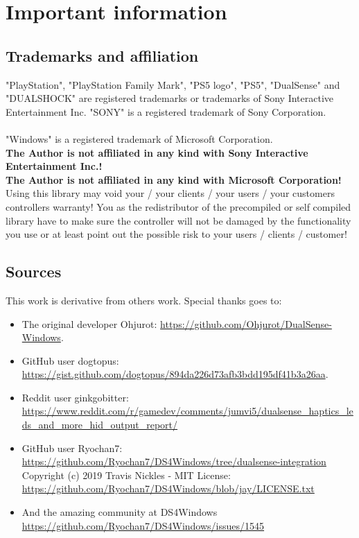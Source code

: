 \section{Important information}
\subsection{Trademarks and affiliation}
"PlayStation", "PlayStation Family Mark", "PS5 logo", "PS5", "DualSense" and "DUALSHOCK" are registered trademarks or trademarks of Sony Interactive Entertainment Inc. "SONY" is a registered trademark of Sony Corporation. \\
\\
"Windows" is a registered trademark of Microsoft Corporation. \\

\textbf{The Author is not affiliated in any kind with Sony Interactive Entertainment Inc.!} \\
\textbf{The Author is not affiliated in any kind with Microsoft Corporation!} \\
Using this library may void your / your clients / your users / your customers controllers warranty! You as the redistributor of the precompiled or self compiled library have to make sure the controller will not be damaged by the functionality you use or at least point out the possible risk to your users / clients / customer!\\

\subsection{Sources}
This work is derivative from others work. Special thanks goes to:
\begin{itemize}
    \item The original developer Ohjurot:
    \url{https://github.com/Ohjurot/DualSense-Windows}.
	\item GitHub user dogtopus: \\ \url{https://gist.github.com/dogtopus/894da226d73afb3bdd195df41b3a26aa}.
	\item Reddit user ginkgobitter: \url{https://www.reddit.com/r/gamedev/comments/jumvi5/dualsense_haptics_leds_and_more_hid_output_report/}
	\item GitHub user Ryochan7: \url{https://github.com/Ryochan7/DS4Windows/tree/dualsense-integration} \\ Copyright (c) 2019 Travis Nickles - MIT License: \url{https://github.com/Ryochan7/DS4Windows/blob/jay/LICENSE.txt} 
	\item And the amazing community at DS4Windows \url{https://github.com/Ryochan7/DS4Windows/issues/1545}
	
\end{itemize}
\newpage

